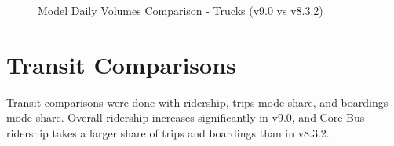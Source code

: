 \documentclass[
  letterpaper,
  DIV=11,
  numbers=noendperiod,
  titlepage=false]{scrreprt}
\begin{document}
\begin{figure}
\begin{minipage}[t]{0.33\linewidth}
{{}

}

\end{minipage}%
%
\begin{minipage}[t]{0.33\linewidth}

{\centering 


}

\end{minipage}%

\caption{\label{fig-pdf-volume-truck-comparison}Model Daily Volumes
Comparison - Trucks (v9.0 vs v8.3.2)}

\end{figure}

\hypertarget{transit-comparisons}{%
\section{Transit Comparisons}\label{transit-comparisons}}

Transit comparisons were done with ridership, trips mode share, and
boardings mode share. Overall ridership increases significantly in v9.0,
and Core Bus ridership takes a larger share of trips and boardings than
in v8.3.2.
\end{document}
